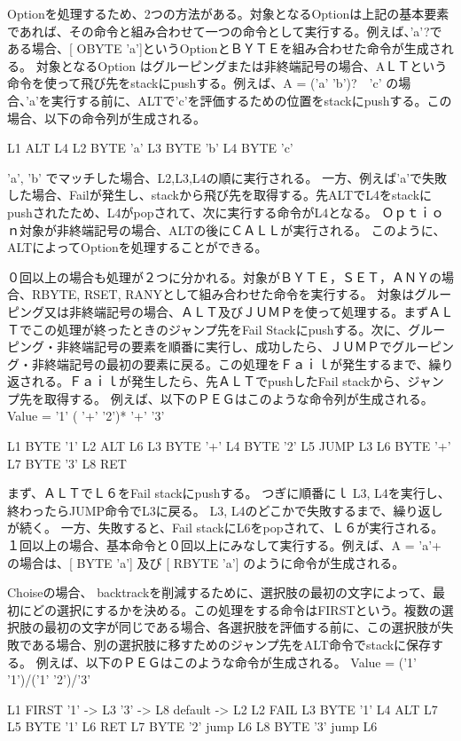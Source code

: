 \documentclass[12pt,oneside]{report}
\begin{document}
Optionを処理するため、2つの方法がある。対象となるOptionは上記の基本要素であれば、その命令と組み合わせて一つの命令として実行する。例えば、'a'?である場合、[ OBYTE 'a']というOptionとＢＹＴＥを組み合わせた命令が生成される。
対象となるOption はグルーピングまたは非終端記号の場合、AＬＴという命令を使って飛び先をstackにpushする。例えば、A = ('a' 'b')?　'c' の場合、'a'を実行する前に、ALTで'c’を評価するための位置をstackにpushする。この
場合、以下の命令列が生成される。

L1 ALT L4 
L2 BYTE 'a'
L3 BYTE 'b'
L4 BYTE 'c'

'a', 'b' でマッチした場合、L2,L3,L4の順に実行される。
一方、例えば'a'で失敗した場合、Failが発生し、stackから飛び先を取得する。先ALTでL4をstackにpushされたため、L4がpopされて、次に実行する命令がL4となる。
Ｏｐｔｉｏｎ対象が非終端記号の場合、ALTの後にＣＡＬＬが実行される。
このように、ALTによってOptionを処理することができる。


０回以上の場合も処理が２つに分かれる。対象がＢＹＴＥ，ＳＥＴ，ＡＮＹの場合、RBYTE, RSET, RANYとして組み合わせた命令を実行する。
対象はグルーピング又は非終端記号の場合、ＡＬＴ及びＪＵＭＰを使って処理する。まずＡＬＴでこの処理が終ったときのジャンプ先をFail Stackにpushする。次に、グルーピング・非終端記号の要素を順番に実行し、成功したら、ＪＵＭＰでグルーピング・非終端記号の最初の要素に戻る。この処理をＦａｉｌが発生するまで、繰り返される。Ｆａｉｌが発生したら、先ＡＬＴでpushしたFail stackから、ジャンプ先を取得する。
例えば、以下のＰＥＧはこのような命令列が生成される。
Value = '1' ( '+' '2')*  '+' '3' 

L1 BYTE '1'
L2 ALT L6 
L3 BYTE '+'
L4 BYTE '2'
L5 JUMP L3
L6 BYTE '+'
L7 BYTE '3'
L8 RET

まず、ＡＬＴでＬ６をFail stackにpushする。
つぎに順番にｌ
L3, L4を実行し、終わったらJUMP命令でL3に戻る。 L3, L4のどこかで失敗するまで、繰り返しが続く。
一方、失敗すると、Fail stackにL6をpopされて、Ｌ６が実行される。
１回以上の場合、基本命令と０回以上にみなして実行する。例えば、A = 'a'+ の場合は、[ BYTE 'a']  及び [ RBYTE 'a'] のように命令が生成される。


Choiseの場合、
backtrackを削減するために、選択肢の最初の文字によって、最初にどの選択にするかを決める。この処理をする命令はFIRSTという。複数の選択肢の最初の文字が同じである場合、各選択肢を評価する前に、この選択肢が失敗である場合、別の選択肢に移すためのジャンプ先をALT命令でstackに保存する。
例えば、以下のＰＥＧはこのような命令が生成される。
Value = ('1' '1')/('1' '2')/'3'

L1 FIRST 
	'1' -> L3
	'3' -> L8
	default -> L2
L2 FAIL
L3 BYTE '1'
L4 ALT L7
L5 BYTE '1'
L6 RET
L7 BYTE '2' jump L6
L8 BYTE '3' jump L6
\end{document}
